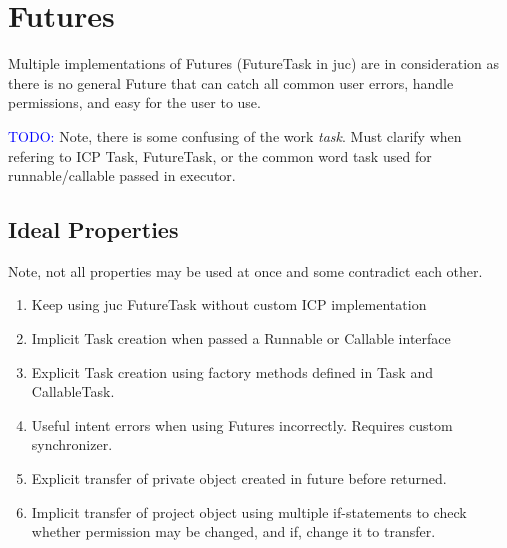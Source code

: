 
\section{Futures}
Multiple implementations of Futures (FutureTask in \gls{juc}) are in consideration as there is no
general Future that can catch all common \gls{user} errors, handle permissions, and easy for the user to
use.

\textcolor{blue}{TODO:}
Note, there is some confusing of the work \textit{task}. Must clarify when refering to
ICP Task, FutureTask, or the common word task used for runnable/callable passed in executor.

\subsection{Ideal Properties}
Note, not all properties may be used at once and some contradict each other.
\begin{enumerate}[label=Property \arabic*., itemindent=*, leftmargin=0pt, ref=\arabic*]
    \item \label{lst:futures:prop:1} Keep using \gls{juc} FutureTask without custom ICP implementation
    \item \label{lst:futures:prop:2} Implicit Task creation when passed a Runnable or Callable interface
    \item \label{lst:futures:prop:3} Explicit Task creation using factory methods defined in Task and CallableTask.
    \item \label{lst:futures:prop:4} Useful intent errors when using Futures incorrectly. Requires custom synchronizer.
    \item \label{lst:futures:prop:5} Explicit transfer of private object created in future before returned.
    \item \label{lst:futures:prop:6} Implicit transfer of project object using multiple if-statements to check whether
    permission may be changed, and if, change it to transfer.
\end{enumerate}

